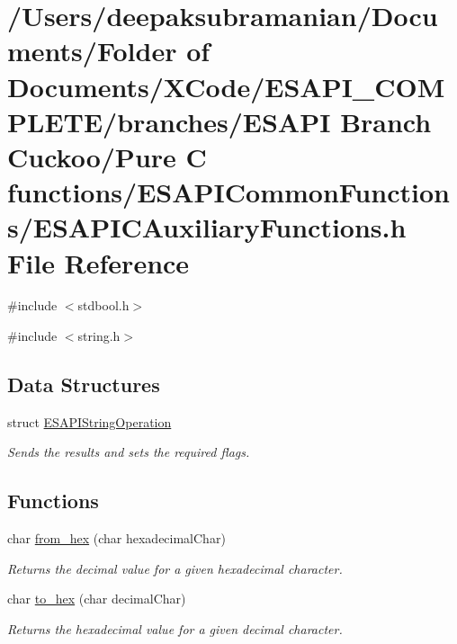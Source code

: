 \hypertarget{a00005}{
\section{/Users/deepaksubramanian/Documents/Folder of Documents/XCode/ESAPI\_\-COMPLETE/branches/ESAPI Branch Cuckoo/Pure C functions/ESAPICommonFunctions/ESAPICAuxiliaryFunctions.h File Reference}
\label{dd/dad/a00005}
}
{\ttfamily \#include $<$stdbool.h$>$}\par
{\ttfamily \#include $<$string.h$>$}\par
\subsection*{Data Structures}
\begin{DoxyCompactItemize}
\item 
struct \hyperlink{a00002}{ESAPIStringOperation}
\begin{DoxyCompactList}\small\item\em Sends the results and sets the required flags. \end{DoxyCompactList}\end{DoxyCompactItemize}
\subsection*{Functions}
\begin{DoxyCompactItemize}
\item 
char \hyperlink{a00005_add5c1df19752ca8972a0ad9271044105}{from\_\-hex} (char hexadecimalChar)
\begin{DoxyCompactList}\small\item\em Returns the decimal value for a given hexadecimal character. \end{DoxyCompactList}\item 
char \hyperlink{a00005_a95b5f7a5b7b116ffbe9a4a439ad167dc}{to\_\-hex} (char decimalChar)
\begin{DoxyCompactList}\small\item\em Returns the hexadecimal value for a given decimal character. \end{DoxyCompactList}\end{DoxyCompactItemize}


